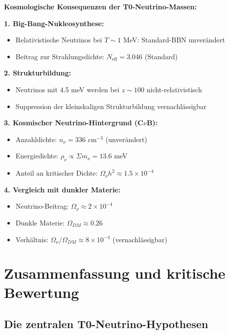 \documentclass[12pt,a4paper]{article}
\begin{document}
	\begin{keyresult}
		\textbf{Kosmologische Konsequenzen der T0-Neutrino-Massen:}
		
		\textbf{1. Big-Bang-Nukleosynthese:}
		\begin{itemize}
			\item Relativistische Neutrinos bei $T \sim 1$ MeV: Standard-BBN unverändert
			\item Beitrag zur Strahlungsdichte: $N_{\text{eff}} = 3.046$ (Standard)
		\end{itemize}
		
		\textbf{2. Strukturbildung:}
		\begin{itemize}
			\item Neutrinos mit 4.5 meV werden bei $z \sim 100$ nicht-relativistisch
			\item Suppression der kleinskaligen Strukturbildung vernachlässigbar
		\end{itemize}
		
		\textbf{3. Kosmischer Neutrino-Hintergrund (C$\nu$B):}
		\begin{itemize}
			\item Anzahldichte: $n_\nu = 336$ cm$^{-3}$ (unverändert)
			\item Energiedichte: $\rho_\nu \propto \Sigma m_\nu = 13.6$ meV
			\item Anteil an kritischer Dichte: $\Omega_\nu h^2 \approx 1.5 \times 10^{-4}$
		\end{itemize}
		
		\textbf{4. Vergleich mit dunkler Materie:}
		\begin{itemize}
			\item Neutrino-Beitrag: $\Omega_\nu \approx 2 \times 10^{-4}$
			\item Dunkle Materie: $\Omega_{DM} \approx 0.26$
			\item Verhältnis: $\Omega_\nu/\Omega_{DM} \approx 8 \times 10^{-4}$ (vernachlässigbar)
		\end{itemize}
	\end{keyresult}
	
	\section{Zusammenfassung und kritische Bewertung}
	
	\subsection{Die zentralen T0-Neutrino-Hypothesen}
	
\end{document}
